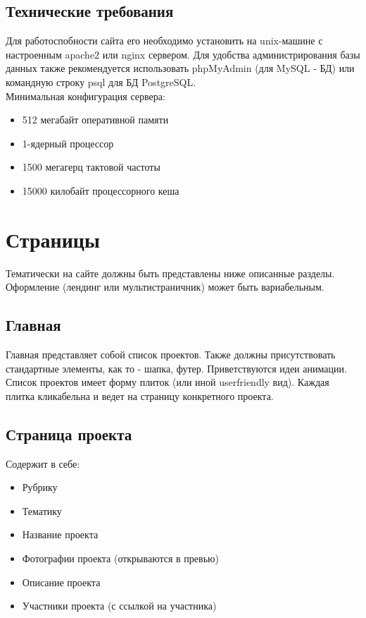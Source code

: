 \documentclass[DIV=calc, paper=a4, fontsize=11pt]{scrartcl} %
\begin{document}
\subsection{Технические требования}
Для работоспобности сайта его необходимо установить на unix-машине с настроенным apache2 или nginx сервером.
Для удобства администрирования базы данных также рекомендуется использовать phpMyAdmin (для MySQL - БД) или командную строку psql для БД PostgreSQL.
\\[0.5cm]
Минимальная конфигурация сервера:
\begin{itemize}
	\item 512 мегабайт оперативной памяти
	\item 1-ядерный процессор
	\item 1500 мегагерц тактовой частоты
	\item 15000 килобайт процессорного кеша
\end{itemize}


\section{Страницы}

Тематически на сайте должны быть представлены ниже описанные разделы. Оформление (лендинг или мультистраничник) может быть вариабельным.

\subsection{Главная}

Главная представляет собой список проектов. Также должны присутствовать стандартные элементы, как то - шапка, футер. Приветствуются идеи анимации.
\\[0.5cm]
Список проектов имеет форму плиток (или иной userfriendly вид). Каждая плитка кликабельна и ведет на страницу конкретного проекта.

\subsection{Страница проекта}
Содержит в себе:
\begin{itemize}
	\item Рубрику
	\item Тематику
	\item Название проекта
	\item Фотографии проекта (открываются в превью)
	\item Описание проекта
	\item Участники проекта (с ссылкой на участника)
\end{itemize}
\end{document}
